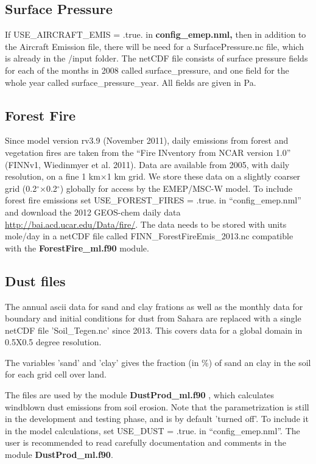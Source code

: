 \subsection{Surface Pressure}

If USE\_AIRCRAFT\_EMIS = .true. in { \bf config\_emep.nml,} then in addition to the Aircraft 
Emission file, there will be need for a SurfacePressure.nc file, which is already in the /input folder. 
The netCDF file consists of surface pressure fields for each of the months in 2008 called surface\_pressure, 
and one field for the whole year called surface\_pressure\_year. All fields are given in Pa. 

\subsection{Forest Fire}
\label{emisff}

Since model version rv3.9 (November 2011), daily emissions from forest and vegetation fires are taken from the “Fire INventory from NCAR version 1.0” (FINNv1,
Wiedinmyer et al. 2011). Data are available from 2005, with daily resolution, on a fine 1 km×1 km grid. We store these data on a slightly coarser grid (0.2$^\circ$×0.2$^\circ$) globally for access by the EMEP/MSC-W model. To include forest fire emissions set 
USE\_FOREST\_FIRES = .true. in ``config\_emep.nml'' and download the 
2012 GEOS-chem daily data \url{http://bai.acd.ucar.edu/Data/fire/}. The data needs to be stored with units mole/day in a netCDF file called FINN\_ForestFireEmis\_2013.nc 
compatible with the { \bf ForestFire\_ml.f90 } module. 

\subsection{Dust files}

The annual ascii data for sand and clay frations as well as the monthly data for boundary and initial conditions for dust from Sahara are replaced with a single netCDF file 'Soil\_Tegen.nc' since 2013.   This covers data for a global domain in 0.5X0.5 degree resolution.  

The variables 'sand' and 'clay' gives the fraction (in \%)  
of sand an clay in the soil for each grid cell over land. 



The files are used by the module {\bf DustProd\_ml.f90 }, which calculates windblown dust 
emissions from soil erosion. Note that the parametrization is still in the development and 
testing phase, and is by default 'turned off'. To include it in the model calculations, set 
USE\_DUST = .true. in ``config\_emep.nml''.
The user is recommended to read carefully documentation and
comments in the module {\bf DustProd\_ml.f90}.

